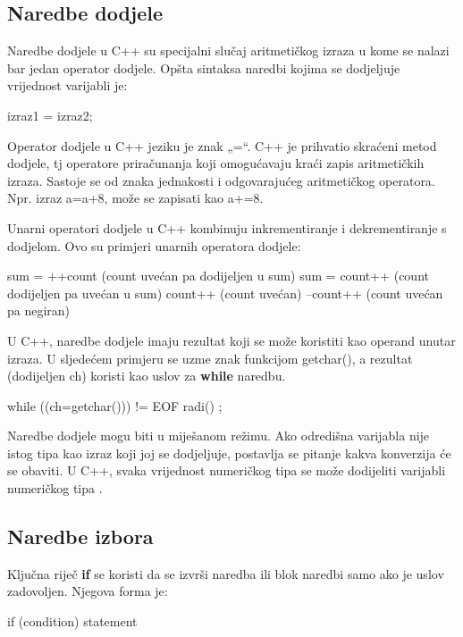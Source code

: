 \documentclass[11pt]{book}
\begin{document}
\subsection{Naredbe dodjele}

Naredbe dodjele u C++ su specijalni slučaj aritmetičkog izraza u kome se nalazi bar jedan operator dodjele. Opšta sintaksa naredbi kojima se dodjeljuje vrijednost varijabli je:

\begin{shortlisting}
  izraz1 = izraz2;
\end{shortlisting}

Operator dodjele u C++ jeziku je znak „=“. C++ je prihvatio skraćeni metod dodjele, tj operatore priračunanja koji omogućavaju kraći zapis aritmetičkih izraza. Sastoje se od znaka jednakosti i odgovarajućeg aritmetičkog operatora. Npr. izraz a=a+8, može se zapisati kao a+=8.

Unarni operatori dodjele u C++ kombinuju inkrementiranje i dekrementiranje
s dodjelom. Ovo su primjeri unarnih operatora dodjele:

\begin{shortlisting}
  sum = ++count (count uvećan pa dodijeljen u sum)
  sum = count++ (count dodijeljen pa uvećan u sum)
  count++ (count uvećan)
  --count++ (count uvećan pa negiran)
\end{shortlisting}

U C++, naredbe dodjele imaju rezultat koji se može koristiti kao operand unutar izraza. U sljedećem primjeru se uzme znak funkcijom getchar(), a rezultat (dodijeljen ch) koristi kao uslov za \textbf{while} naredbu.

\begin{shortlisting}
  while ((ch=getchar())) != EOF {radi() ;}
\end{shortlisting}


Naredbe dodjele mogu biti u miješanom režimu. Ako odredišna varijabla nije istog tipa kao izraz koji joj se dodjeljuje, postavlja se pitanje kakva konverzija će se obaviti. U C++, svaka vrijednost numeričkog tipa se može dodijeliti varijabli numeričkog tipa .

\subsection{Naredbe izbora}

Ključna riječ \textbf{if} se koristi da se izvrši naredba ili blok naredbi samo ako je uslov zadovoljen. Njegova forma je:

\begin{shortlisting}
  if (condition)
  statement
\end{shortlisting}
\end{document}
